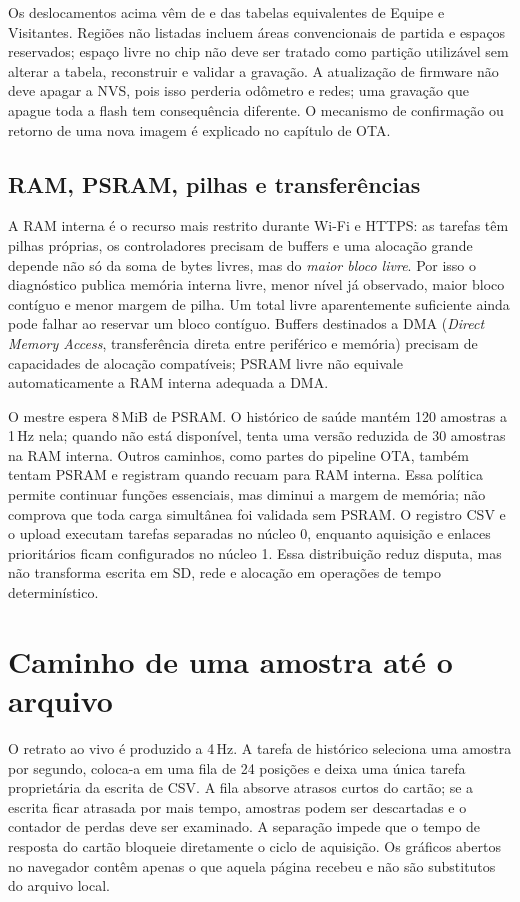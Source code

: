 Os deslocamentos acima vêm de  e das tabelas equivalentes de Equipe e Visitantes. Regiões não listadas incluem áreas convencionais de partida e espaços reservados; espaço livre no chip não deve ser tratado como partição utilizável sem alterar a tabela, reconstruir e validar a gravação. A atualização de firmware não deve apagar a NVS, pois isso perderia odômetro e redes; uma gravação que apague toda a flash tem consequência diferente. O mecanismo de confirmação ou retorno de uma nova imagem é explicado no capítulo de OTA.

\subsection{RAM, PSRAM, pilhas e transferências}
A RAM interna é o recurso mais restrito durante Wi-Fi e HTTPS: as tarefas têm pilhas próprias, os controladores precisam de buffers e uma alocação grande depende não só da soma de bytes livres, mas do \emph{maior bloco livre}. Por isso o diagnóstico publica memória interna livre, menor nível já observado, maior bloco contíguo e menor margem de pilha. Um total livre aparentemente suficiente ainda pode falhar ao reservar um bloco contíguo. Buffers destinados a DMA (\emph{Direct Memory Access}, transferência direta entre periférico e memória) precisam de capacidades de alocação compatíveis; PSRAM livre não equivale automaticamente a RAM interna adequada a DMA.

O mestre espera 8\,MiB de PSRAM. O histórico de saúde mantém 120 amostras a 1\,Hz nela; quando não está disponível, tenta uma versão reduzida de 30 amostras na RAM interna. Outros caminhos, como partes do pipeline OTA, também tentam PSRAM e registram quando recuam para RAM interna. Essa política permite continuar funções essenciais, mas diminui a margem de memória; não comprova que toda carga simultânea foi validada sem PSRAM. O registro CSV e o upload executam tarefas separadas no núcleo 0, enquanto aquisição e enlaces prioritários ficam configurados no núcleo 1. Essa distribuição reduz disputa, mas não transforma escrita em SD, rede e alocação em operações de tempo determinístico.

\section{Caminho de uma amostra até o arquivo}\label{sec:csv_fluxo}
O retrato ao vivo é produzido a 4\,Hz. A tarefa de histórico seleciona uma amostra por segundo, coloca-a em uma fila de 24 posições e deixa uma única tarefa proprietária da escrita de CSV. A fila absorve atrasos curtos do cartão; se a escrita ficar atrasada por mais tempo, amostras podem ser descartadas e o contador de perdas deve ser examinado. A separação impede que o tempo de resposta do cartão bloqueie diretamente o ciclo de aquisição. Os gráficos abertos no navegador contêm apenas o que aquela página recebeu e não são substitutos do arquivo local.

